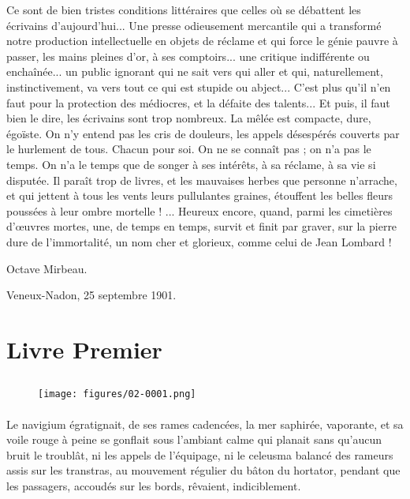 \documentclass[a4paper, 11pt, oneside, polutonikogreek, french]{article}
\begin{document}
Ce sont de bien tristes conditions littéraires que celles où se débattent les écrivains d'aujourd'hui... Une presse odieusement mercantile qui a transformé notre production intellectuelle en objets de réclame et qui force le génie pauvre à passer, les mains pleines d'or, à ses comptoirs... une critique indifférente ou enchaînée... un public ignorant qui ne sait vers qui aller et qui, naturellement, instinctivement, va vers tout ce qui est stupide ou abject... C'est plus qu'il n'en faut pour la protection des médiocres, et la défaite des talents... Et puis, il faut bien le dire, les écrivains sont trop nombreux. La mêlée est compacte, dure, égoïste. On n'y entend pas les cris de douleurs, les appels désespérés couverts par le hurlement de tous. Chacun pour soi. On ne se connaît pas ; on n'a pas le temps. On n'a le temps que de songer à ses intérêts, à sa réclame, à sa vie si disputée. Il paraît trop de livres, et les mauvaises herbes que personne n'arrache, et qui jettent à tous les vents leurs pullulantes graines, étouffent les belles fleurs poussées à leur ombre mortelle ! ... Heureux encore, quand, parmi les cimetières d'œuvres mortes, une, de temps en temps, survit et finit par graver, sur la pierre dure de l'immortalité, un nom cher et glorieux, comme celui de Jean Lombard !

Octave Mirbeau.

Veneux-Nadon, 25 septembre 1901.
\clearpage
\section{Livre Premier}
\subsection{}
\begin{figure}[H]
\centering
\texttt{[image: figures/02-0001.png]}
\end{figure}
\paragraph{}
Le navigium égratignait, de ses rames cadencées, la mer saphirée, vaporante, et sa voile rouge à peine se gonflait sous l'ambiant calme qui planait sans qu'aucun bruit le troublât, ni les appels de l'équipage, ni le celeusma balancé des rameurs assis sur les transtras, au mouvement régulier du bâton du hortator, pendant que les passagers, accoudés sur les bords, rêvaient, indiciblement.
\end{document}
